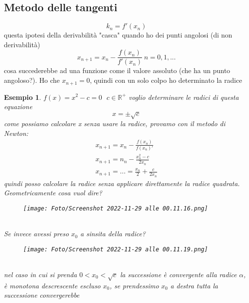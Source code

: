 \documentclass[a4paper, portrait]{book}
\numberwithin{equation}{chapter} %
\newtheorem{example}{Esempio}
\begin{document}
\subsection*{Metodo delle tangenti}
\begin{equation}
    k_n = f'(x_n)
\end{equation}
questa ipotesi della derivabilità "casca" quando ho dei punti angolosi (di non derivabilità)
\begin{equation}
    x_{n+1} = x_n - \frac{f(x_n)}{f'(x_n)} \ n = 0,1,...
\end{equation}
cosa succederebbe ad una funzione come il valore assoluto (che ha un punto angoloso?). Ho che $x_{n+1} = 0$, quindi con un solo colpo ho determinato la radice
\begin{example}
    $f(x) = x^2 - c = 0 \ \ \ c \in \mathbb{R}^+$ voglio determinare le radici di questa equazione 
    \begin{equation}
        x = \pm \sqrt{c}
    \end{equation}
    come possiamo calcolare x senza usare la radice, provamo con il metodo di Newton:
    \begin{gather}
        x_{n+1} = x_n - \frac{f(x_n)}{f(x_n)'}\\
        x_{n+1} = n_n - \frac{x_n^2-c}{2x_n}\\
        x_{n+1} = ... = \frac{x_n}{2} + \frac{c}{2x_n}
    \end{gather}
    quindi posso calcolare la radice senza applicare direttamente la radice quadrata.\\
    Geometricamente cosa vuol dire?
    \begin{figure}[h!]
        \centering
        \texttt{[image: Foto/Screenshot 2022-11-29 alle 00.11.16.png]}
        \caption{}
    \end{figure}
    \\Se invece avessi preso $x_0$ a sinsita della radice?
    \begin{figure}[h!]
        \centering
        \texttt{[image: Foto/Screenshot 2022-11-29 alle 00.11.19.png]}
        \caption{}
    \end{figure}
    \\nel caso in cui si prenda $0 < x_0 < \sqrt{c}$ la successione è convergente alla radice $\alpha$, è monotona descrescente escluso $x_0$, se prendessimo $x_0$ a destra tutta la successione convergerebbe
\end{example}
\end{document}
